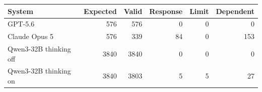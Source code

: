 \begin{tabular}{lrrrrr}
\toprule
System & Expected & Valid & Response & Limit & Dependent \\
\midrule
GPT-5.6 & 576 & 576 & 0 & 0 & 0 \\
Claude Opus 5 & 576 & 339 & 84 & 0 & 153 \\
Qwen3-32B thinking off & 3840 & 3840 & 0 & 0 & 0 \\
Qwen3-32B thinking on & 3840 & 3803 & 5 & 5 & 27 \\
\bottomrule
\end{tabular}

